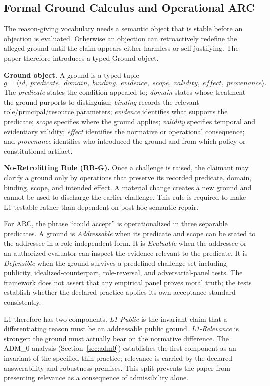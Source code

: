 \documentclass[11pt]{article}
\def\ensuremath#1{#1}%
\def\mathrm#1{#1}%
\def\mathsf#1{#1}%
\newcommand{\ADM}{\texorpdfstring{\ensuremath{\mathrm{ADM}_0}}{ADM0}}
\newcommand{\Ground}{\ensuremath{\mathsf{Ground}}}
\begin{document}
\subsection{Formal Ground Calculus and Operational ARC}\label{sec:ground}
The reason-giving vocabulary needs a semantic object that is stable before an objection is evaluated. Otherwise an objection can retroactively redefine the alleged ground until the claim appears either harmless or self-justifying. The paper therefore introduces a typed \Ground{} object.
\begin{paperbox}
\textbf{Ground object.} A ground is a typed tuple
\[
g=\langle id,\; predicate,\; domain,\; binding,\; evidence,\; scope,\; validity,\; effect,\; provenance\rangle.
\]
The \emph{predicate} states the condition appealed to; \emph{domain} states whose treatment the ground purports to distinguish; \emph{binding} records the relevant role/principal/resource parameters; \emph{evidence} identifies what supports the predicate; \emph{scope} specifies where the ground applies; \emph{validity} specifies temporal and evidentiary validity; \emph{effect} identifies the normative or operational consequence; and \emph{provenance} identifies who introduced the ground and from which policy or constitutional artifact.
\end{paperbox}

\textbf{No-Retrofitting Rule (RR-G).} Once a challenge is raised, the claimant may clarify a ground only by operations that preserve its recorded predicate, domain, binding, scope, and intended effect. A material change creates a new ground and cannot be used to discharge the earlier challenge. This rule is required to make L1 testable rather than dependent on post-hoc semantic repair.

For ARC, the phrase ``could accept'' is operationalized in three separable predicates. A ground is \emph{Addressable} when its predicate and scope can be stated to the addressee in a role-independent form. It is \emph{Evaluable} when the addressee or an authorized evaluator can inspect the evidence relevant to the predicate. It is \emph{Defensible} when the ground survives a predefined challenge set including publicity, idealized-counterpart, role-reversal, and adversarial-panel tests. The framework does not assert that any empirical panel proves moral truth; the tests establish whether the declared practice applies its own acceptance standard consistently.

L1 therefore has two components. \emph{L1-Public} is the invariant claim that a differentiating reason must be an addressable public ground. \emph{L1-Relevance} is stronger: the ground must actually bear on the normative difference. The \ADM{} analysis (Section~\ref{sec:adm0}) establishes the first component as an invariant of the specified thin practice; relevance is carried by the declared answerability and robustness premises. This split prevents the paper from presenting relevance as a consequence of admissibility alone.
\end{document}
